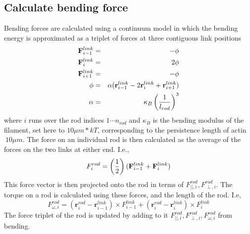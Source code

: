 \documentclass[11pt]{article}
\begin{document}
\subsection{Calculate bending force}
Bending forces are calculated using a continuum model \cite{nedelec} in which the bending energy is approximated as a
triplet of forces at three contiguous link positions
\begin{eqnarray}
  \mathbf{F}^{link}_{i-1} &=& -\phi\nonumber\\
  \mathbf{F}^{link}_{i} &=& 2\phi\nonumber\\
  \mathbf{F}^{link}_{i+1} &=& -\phi\nonumber\\
  \phi &=& \alpha(\mathbf{r}^{link}_{i-1} - 2\mathbf{r}^{link}_i + \mathbf{r}^{link}_{i+1})\nonumber\\
  \alpha &=& \kappa_B\left( 1\over l_{rod} \right)^3
  \label{eqn:flink}
\end{eqnarray}
where $i$ runs over the rod indices $1\cdots n_{rod}$ and $\kappa_B$ is the bending modulus of the filament, set here to
$10\mu m*kT$, corresponding to the persistence length of actin $~10\mu m$. The force on an individual rod is then
calculated as the average of the forces on the two links at either end. I.e.,
\begin{equation} 
  F^{rod}_i = \left( 1\over2 \right)(\mathbf{F}^{link}_{i-1} + \mathbf{F}^{link}_{i})
  \label{eqn:frod}
\end{equation}
This force vector is then projected onto the rod in terms of ${F^{rod}_{||,i}, F^{rod}_{\perp,i}}$. 
The torque on a rod is calculated using these forces, and the length of the rod. I.e,
\begin{equation}
  F^{rod}_{\omega,i} = \left(  \mathbf{r}^{rod}_{i} - \mathbf{r}^{link}_{i-1}\right)\times F^{link}_{i-1} + 
  \left(  \mathbf{r}^{rod}_{i} - \mathbf{r}^{link}_{i}\right)\times F^{link}_{i}
  \label{eqn:trqrod}
\end{equation}
The force triplet of the rod is updated by adding to it ${F^{rod}_{||,i}, F^{rod}_{\perp,i}, F^{rod}_{\omega,i}}$ from
bending.
\end{document}
